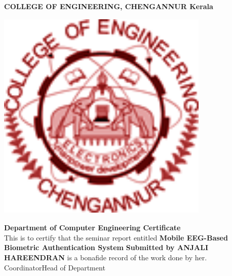 \begin{center}


{\large\textbf{COLLEGE OF ENGINEERING, CHENGANNUR \linebreak Kerala}\vspace{1cm}} \\ \bigskip %


\includegraphics[height=4in,width=4in]{emblem1.png} \\ \medskip %

\begingroup
{\large\textbf{Department of Computer Engineering\vspace{1cm} \linebreak Certificate}} \\ \bigskip
{{\large {This is to certify that the seminar report entitled}}\vspace{1cm}\linebreak}
{{\large \textbf{Mobile EEG-Based Biometric Authentication System \vspace{1cm} \linebreak}}}
{{\normalsize \textbf{Submitted by \linebreak ANJALI HAREENDRAN}}\vspace{.5cm}\linebreak}
{{\large is a bonafide record of the work done by her.}\vspace{3cm}}\\ \bigskip
{{\normalsize Coordinator\hspace{10cm}Head of Department\vspace{5cm}}}\\ \bigskip
\endgroup
\end{center}
